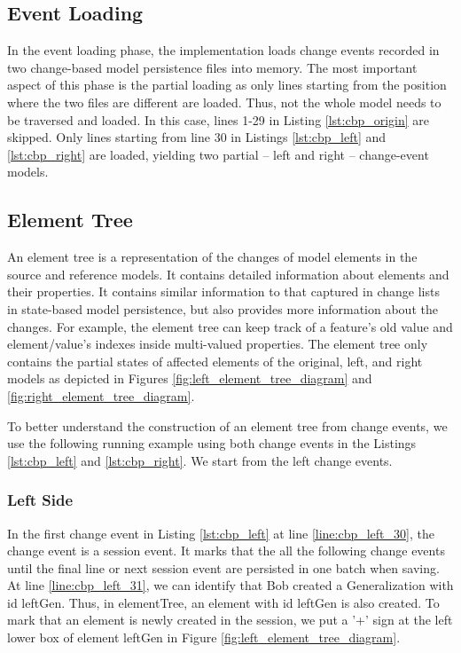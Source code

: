 \subsection{Event Loading}
\label{sec:event_loading}
In the event loading phase, the implementation loads change events recorded in two change-based model persistence files into memory.
The most important aspect of this phase is the partial loading as only lines starting from the position where the two files are different are loaded.
Thus, not the whole model needs to be traversed and loaded.
In this case, lines 1-29 in Listing \ref{lst:cbp_origin} are skipped. Only lines starting from line 30 in Listings \ref{lst:cbp_left} and \ref{lst:cbp_right} are loaded, yielding two partial -- left and right -- change-event models. 

\subsection{Element Tree}
\label{sec:tree_construction}
An element tree is a representation of the changes of model elements in the source and reference models. It contains detailed information about elements and their properties. It contains similar information to that captured in change lists in state-based model persistence, but also provides more information about the changes. For example, the element tree can keep track of a feature's old value and element/value's indexes inside multi-valued properties. The element tree only contains the partial states of affected elements of the original, left, and right models as depicted in Figures \ref{fig:left_element_tree_diagram} and \ref{fig:right_element_tree_diagram}.

To better understand the construction of an element tree from change events, we use the following running example using both change events in the Listings \ref{lst:cbp_left} and \ref{lst:cbp_right}. We start from the left change events. 

\subsubsection{Left Side}\label{sec:left_side}
In the first change event in Listing \ref{lst:cbp_left} at line \ref{line:cbp_left_30}, the change event is a \textsf{session} event. It marks that the all the following change events until the final line or next \textsf{session} event are persisted in one batch when saving. At line \ref{line:cbp_left_31}, we can identify that Bob created a \textsf{Generalization} with id \textsf{leftGen}. Thus, in \textsf{elementTree}, an element with id \textsf{leftGen} is also created. To mark that an element is newly created in the session, we put a '+' sign at the left lower box of element \textsf{leftGen} in Figure \ref{fig:left_element_tree_diagram}.

